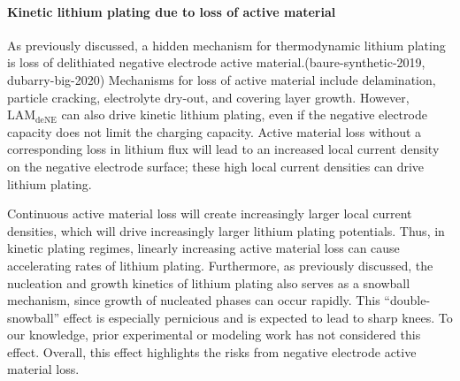 \documentclass[journal=jpcl, manuscript=article, layout=onecolumn]{achemso}
\begin{document}
\paragraph{Kinetic lithium plating due to loss of active material}
As previously discussed, a hidden mechanism for thermodynamic lithium plating is loss of delithiated negative electrode active material.\cite{ansean_operando_2017, dubarry_durability_2018}(baure-synthetic-2019, dubarry-big-2020) Mechanisms for loss of active material include delamination, particle cracking, electrolyte dry-out, and covering layer growth. However, $\mathrm{LAM_{deNE}}$ can also drive kinetic lithium plating, even if the negative electrode capacity does not limit the charging capacity. Active material loss without a corresponding loss in lithium flux will lead to an increased local current density on the negative electrode surface; these high local current densities can drive lithium plating.

Continuous active material loss will create increasingly larger local current densities, which will drive increasingly larger lithium plating potentials. Thus, in kinetic plating regimes, linearly increasing active material loss can cause accelerating rates of lithium plating. Furthermore, as previously discussed, the nucleation and growth kinetics of lithium plating also serves as a snowball mechanism, since growth of nucleated phases can occur rapidly. This ``double-snowball'' effect is especially pernicious and is expected to lead to sharp knees. To our knowledge, prior experimental or modeling work has not considered this effect. Overall, this effect highlights the risks from negative electrode active material loss.
\end{document}
